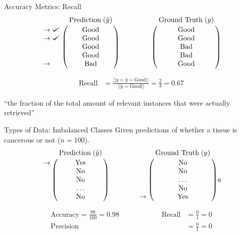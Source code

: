 \documentclass[usenames,dvipsnames]{beamer}
\begin{document}
\begin{frame}{Accuracy Metrics: Recall}
$$
\bordermatrix{&\text{Prediction}\;(\hat{y})\cr
               \rightarrow\checkmark&\text{Good}\cr
               \rightarrow\checkmark&\text{Good}\cr
                &\text{Good}\cr
                &\text{Good}\cr
               \rightarrow&\text{Bad}}
\qquad \qquad
\bordermatrix{&\text{Ground Truth}\;(y)\cr
                &\text{Good}\cr
                &\text{Good}\cr
                &\text{Bad}\cr
                &\text{Bad}\cr
                &\text{Good}}
$$

\begin{align*}
\text{Recall} &= \frac{||y = \hat{y} = \text{Good}||}{||y = \text{Good}||} = \frac{2}{3} = 0.67
\end{align*}

``the fraction of the total amount of relevant instances that were actually retrieved''

\end{frame}

\begin{frame}{Types of Data: Imbalanced Classes}
Given predictions of whether a tissue is cancerous or not ($n = 100$).
$$
\bordermatrix{&\text{Prediction}\;(\hat{y})\cr
               \rightarrow&\text{Yes}\cr
               &\text{No}\cr
                &\text{No}\cr
                &\ldots\cr
               &\text{No}}
\qquad \qquad
\bordermatrix{&\text{Ground Truth}\;(y)\cr
                &\text{No}\cr
                &\text{No}\cr
                &\ldots\cr
                &\text{No}\cr
                \rightarrow&\text{Yes}}a
            $$

\pause 
\begin{align*}
\text{Accuracy} = \frac{98}{100} = 0.98 \qquad \qquad \qquad
\text{Recall} &= \frac{0}{1} = 0 \\
\text{Precision} &= \frac{0}{1} = 0
\end{align*}


\end{frame}
\end{document}
